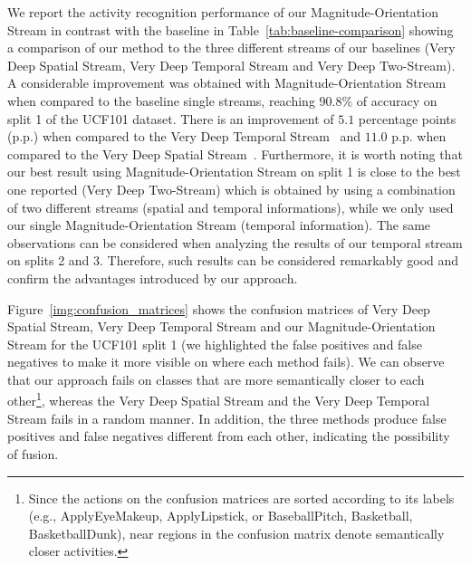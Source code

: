 \documentclass[10pt,conference]{IEEEtran}
\begin{document}
We report the activity recognition performance of our Magnitude-Orientation Stream in contrast with the baseline in Table~\ref{tab:baseline-comparison} showing a comparison of our method to the three different streams of our baselines (Very Deep Spatial Stream, Very Deep Temporal Stream and Very Deep Two-Stream). A considerable improvement was obtained with Magnitude-Orientation Stream when compared to the baseline single streams, reaching $90.8\%$ of accuracy on split 1 of the UCF101 dataset. There is an improvement of $5.1$ percentage points (p.p.) when compared to the Very Deep Temporal Stream~\cite{Wang:2015} and $11.0$ p.p. when compared to the Very Deep Spatial Stream~\cite{Wang:2015}. Furthermore, it is worth noting that our best result using Magnitude-Orientation Stream on split 1 is close to the best one reported (Very Deep Two-Stream) which is obtained by using a combination of two different streams (spatial and temporal informations), while we only used our single Magnitude-Orientation Stream (temporal information). The same observations can be considered when analyzing the results of our temporal stream on splits 2 and 3. Therefore, such results can be considered remarkably good and confirm the advantages introduced by our approach.


Figure~\ref{img:confusion_matrices} shows the confusion matrices of Very Deep Spatial Stream, Very Deep Temporal Stream and our Magnitude-Orientation Stream for the UCF101 split 1 (we highlighted the false positives and false negatives to make it more visible on where each method fails). We can observe that our approach fails on classes that are more semantically closer to each other\footnote{Since the actions on the confusion matrices are sorted according to its labels (e.g., ApplyEyeMakeup, ApplyLipstick, or BaseballPitch, Basketball, BasketballDunk), near regions in the confusion matrix denote  semantically closer activities.}, whereas the Very Deep Spatial Stream and the Very Deep Temporal Stream fails in a random manner. In addition, the three methods produce false positives and false negatives different from each other, indicating the possibility of fusion. 
\end{document}
